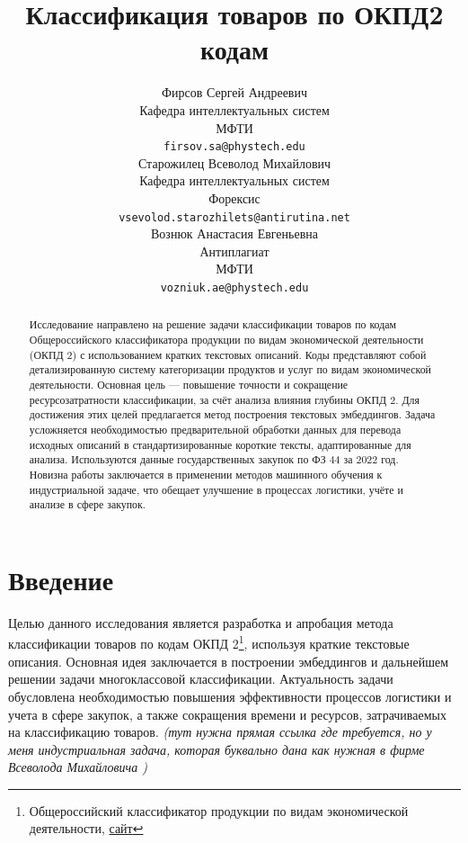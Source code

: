 \documentclass{article}
\title{Классификация товаров по ОКПД2 кодам}
\author{ Фирсов Сергей Андреевич\\
        Кафедра интеллектуальных систем\\
	МФТИ\\
	\texttt{firsov.sa@phystech.edu} \\
	\And
	Старожилец Всеволод Михайлович  \\
	Кафедра интеллектуальных систем\\
	Форексис\\
	\texttt{vsevolod.starozhilets@antirutina.net} \\
	\AND
	Вознюк Анастасия Евгеньевна \\
	Антиплагиат \\
        МФТИ \\
        \texttt{vozniuk.ae@phystech.edu} \\
}
\date{}
\begin{document}
\maketitle

\begin{abstract}
    Исследование направлено на решение задачи классификации товаров по кодам Общероссийского классификатора продукции по видам экономической деятельности (ОКПД 2) с использованием кратких текстовых описаний. Коды представляют собой детализированную систему категоризации продуктов и услуг по видам экономической деятельности. Основная цель --- повышение точности и сокращение ресурсозатратности классификации, за счёт анализа влияния глубины ОКПД 2. Для достижения этих целей предлагается метод построения текстовых эмбеддингов. Задача усложняется необходимостью предварительной обработки данных для перевода исходных описаний в стандартизированные короткие тексты, адаптированные для анализа. Используются данные государственных закупок по ФЗ 44 за 2022 год. Новизна работы заключается в применении методов машинного обучения к индустриальной задаче, что обещает улучшение в процессах логистики, учёте и анализе в сфере закупок. 


 
\end{abstract}



\section{Введение}

Целью данного исследования является разработка и апробация метода классификации товаров по кодам ОКПД 2\footnote{Общероссийский классификатор продукции по видам экономической деятельности, \href{https://classifikators.ru/okpd}{сайт}}, используя краткие текстовые описания. Основная идея заключается в построении эмбеддингов и дальнейшем решении задачи многоклассовой классификации. Актуальность задачи обусловлена необходимостью повышения эффективности процессов логистики и учета в сфере закупок, а также сокращения времени и ресурсов, затрачиваемых на классификацию товаров. \textit{(тут нужна прямая ссылка где требуется, но у меня индустриальная задача, которая буквально дана как нужная в фирме Всеволода Михайловича )}
\end{document}
